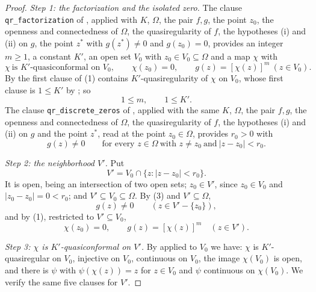 \begin{proof}
\emph{Step 1: the factorization and the isolated zero.}  The clause
\texttt{qr\_factorization} of , applied with $K$, $\Omega$,
the pair $f,g$, the point $z_0$, the openness and connectedness of $\Omega$,
the quasiregularity of $f$, the hypotheses (i) and (ii) on $g$, the point
$z^{*}$ with $g(z^{*})\neq0$ and $g(z_0)=0$, provides an integer $m\ge1$, a
constant $K'$, an open set $V_0$ with $z_0\in V_0\subseteq\Omega$ and a map
$\chi$ with
\begin{equation}\tag{1}
  \chi\ \text{is }K'\text{-quasiconformal on }V_0,\qquad \chi(z_0)=0,\qquad
  g(z)=[\chi(z)]^{m}\ (z\in V_0).
\end{equation}
By  the first clause of (1) contains
$K'$-quasiregularity of $\chi$ on $V_0$, whose first clause is $1\le K'$ by
; so
\begin{equation}\tag{2}
  1\le m,\qquad 1\le K'.
\end{equation}
The clause \texttt{qr\_discrete\_zeros} of , applied with
the same $K$, $\Omega$, the pair $f,g$, the openness and connectedness of
$\Omega$, the quasiregularity of $f$, the hypotheses (i) and (ii) on $g$ and
the point $z^{*}$, read at the point $z_0\in\Omega$, provides $r_0>0$ with
\begin{equation}\tag{3}
  g(z)\neq0\qquad\text{for every }z\in\Omega\ \text{with }z\neq z_0\
  \text{and}\ |z-z_0|<r_0 .
\end{equation}

\emph{Step 2: the neighborhood $V'$.}  Put
\[
  V'=V_0\cap\{z:|z-z_0|<r_0\} .
\]
It is open, being an intersection of two open sets; $z_0\in V'$, since
$z_0\in V_0$ and $|z_0-z_0|=0<r_0$; and $V'\subseteq V_0\subseteq\Omega$.  By
(3) and $V'\subseteq\Omega$,
\begin{equation}\tag{4}
  g(z)\neq0\qquad(z\in V'-\{z_0\}),
\end{equation}
and by (1), restricted to $V'\subseteq V_0$,
\begin{equation}\tag{5}
  \chi(z_0)=0,\qquad g(z)=[\chi(z)]^{m}\quad(z\in V').
\end{equation}

\emph{Step 3: $\chi$ is $K'$-quasiconformal on $V'$.}  By
 applied to $V_0$ we have: $\chi$ is
$K'$-quasiregular on $V_0$, injective on $V_0$, continuous on $V_0$, the image
$\chi(V_0)$ is open, and there is $\psi$ with $\psi(\chi(z))=z$ for $z\in V_0$
and $\psi$ continuous on $\chi(V_0)$.  We verify the same five clauses for
$V'$.


\end{proof}
